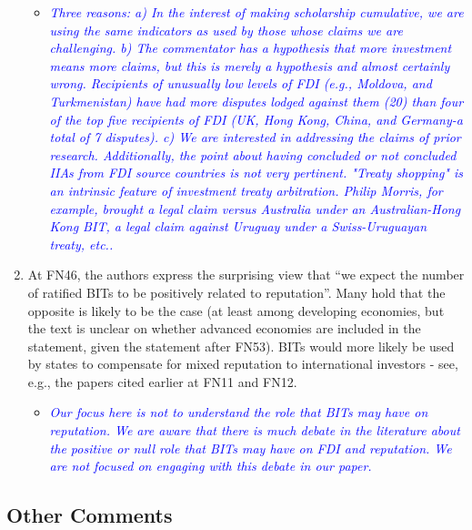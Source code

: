 \begin{enumerate}
	\begin{itemize}
		\item \textcolor{blue}{ \emph{
		Three reasons: a) In the interest of making scholarship cumulative, we are using the same indicators as used by those whose claims we are challenging. b) The commentator has a hypothesis that more investment means more claims, but this is merely a hypothesis and almost certainly wrong. Recipients of unusually low levels of  FDI (e.g., Moldova, and Turkmenistan) have had more disputes lodged against them (20) than four of the top five recipients of FDI (UK, Hong Kong, China, and Germany-a total of 7 disputes). c) We are interested in addressing the claims of prior research. Additionally, the point about having concluded or not concluded IIAs from FDI source countries is not very pertinent. "Treaty shopping" is an intrinsic feature of investment treaty arbitration. Philip Morris, for example, brought a legal claim versus Australia under an Australian-Hong Kong BIT, a legal claim against Uruguay under a Swiss-Uruguayan treaty, etc..
		}}
	\end{itemize}
	\item At FN46, the authors express the surprising view that ``we expect the number of ratified BITs to be positively related to reputation''. Many hold that the opposite is likely to be the case (at least among developing economies, but the text is unclear on whether advanced economies are included in the statement, given the statement after FN53). BITs would more likely be used by states to compensate for mixed reputation to international investors - see, e.g., the papers cited earlier at FN11 and FN12. 
	\begin{itemize}
		\item \textcolor{blue}{ \emph{ 
		Our focus here is not to understand the role that BITs may have on reputation. We are aware that there is much debate in the literature about the positive or null role that BITs may have on FDI and reputation. We are not focused on engaging with this debate in our paper. 
		}}
	\end{itemize}
\end{enumerate}

\subsection*{Other Comments}

